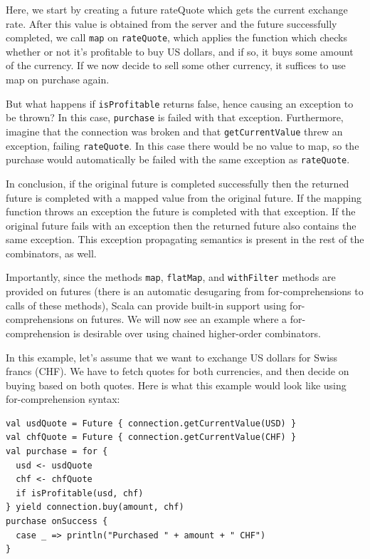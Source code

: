 Here, we start by creating a future rateQuote which gets the current exchange
rate. After this value is obtained from the server and the future successfully
completed, we call \verb|map| on \verb|rateQuote|, which applies the function
which checks whether or not it's profitable to buy US dollars, and if so, it
buys some amount of the currency. If we now decide to sell some other currency,
it suffices to use map on purchase again.

But what happens if \verb|isProfitable| returns false, hence causing an
exception to be thrown? In this case, \verb|purchase| is failed with that
exception. Furthermore, imagine that the connection was broken and that
\verb|getCurrentValue| threw an exception, failing \verb|rateQuote|. In this
case there would be no value to map, so the purchase would automatically be
failed with the same exception as \verb|rateQuote|.

In conclusion, if the original future is completed successfully then the
returned future is completed with a mapped value from the original future. If
the mapping function throws an exception the future is completed with that
exception. If the original future fails with an exception then the returned
future also contains the same exception. This exception propagating semantics is
present in the rest of the combinators, as well.

Importantly, since the methods \verb|map|, \verb|flatMap|, and \verb|withFilter|
methods are provided on futures (there is an automatic desugaring from
for-comprehensions to calls of these methods), Scala can provide built-in
support using for-comprehensions on futures. We will now see an
example where a for-comprehension is desirable over using chained higher-order
combinators.

In this example, let's assume that we want to exchange US dollars for Swiss
francs (CHF). We have to fetch quotes for both currencies, and then decide on
buying based on both quotes. Here is what this example would look like using for-comprehension syntax:

\begin{verbatim}
val usdQuote = Future { connection.getCurrentValue(USD) }
val chfQuote = Future { connection.getCurrentValue(CHF) }
val purchase = for {
  usd <- usdQuote
  chf <- chfQuote
  if isProfitable(usd, chf)
} yield connection.buy(amount, chf)
purchase onSuccess {
  case _ => println("Purchased " + amount + " CHF")
}
\end{verbatim}

